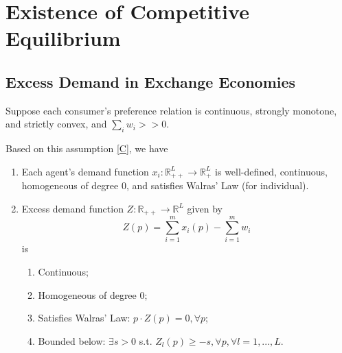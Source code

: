 \documentclass[11pt]{elegantbook}
\begin{document}
\section{Existence of Competitive Equilibrium}
\subsection{Excess Demand in Exchange Economies}
\begin{assumption}\label{C}
    Suppose each consumer's preference relation is continuous, strongly monotone, and strictly convex, and $\sum_{i}w_i>>0$.
\end{assumption}
Based on this assumption \ref{C}, we have
\begin{enumerate}[$\circ$]
    \item Each agent's demand function $x_i:\mathbb{R}^L_{++} \rightarrow \mathbb{R}^L_+$ is well-defined, continuous, homogeneous of degree $0$, and satisfies Walras' Law (for individual).
    \item Excess demand function $Z:\mathbb{R}_{++} \rightarrow \mathbb{R}^L$ given by $$Z(p)=\sum_{i=1}^m x_i(p)-\sum_{i=1}^m w_i$$ is
    \begin{definition}[Condition (1) to (4)]
        \normalfont
        \begin{enumerate}[(1).]
            \item Continuous;
            \item Homogeneous of degree $0$;
            \item Satisfies Walras' Law: $p\cdot Z(p)=0, \forall p$;
            \item Bounded below: $\exists s>0$ s.t. $Z_l(p)\geq -s, \forall p, \forall l=1,...,L$.
        \end{enumerate}
    \end{definition}
\end{enumerate}
\end{document}
